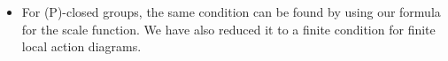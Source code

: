 \documentclass[preview]{standalone}
\begin{document}
\begin{center}
\begin{itemize} \item For (P)-closed groups, the same condition can be found by using our formula for the scale function. We have also reduced it to a finite condition for finite local action diagrams.\vspace{-10pt}\end{itemize}
\end{center}
\end{document}
